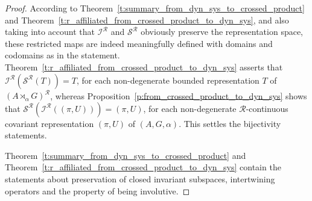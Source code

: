 \documentclass{amsart}
\theoremstyle{plain}
\theoremstyle{definition}
\numberwithin{equation}{section}
\begin{document}
\begin{proof}
According to Theorem~\ref{t:summary_from_dyn_sys_to_crossed_product} and Theorem~\ref{t:r_affiliated_from_crossed_product_to_dyn_sys}, and also taking into account that ${{\mathcal I}^{\mathcal R}}$ and ${{\mathcal S}^{\mathcal R}}$ obviously preserve the representation space, these restricted maps are indeed meaningfully defined with domains and codomains as in the statement.
Theorem~\ref{t:r_affiliated_from_crossed_product_to_dyn_sys} asserts that ${{\mathcal I}^{\mathcal R}}({{\mathcal S}^{\mathcal R}}(T)) = T$, for each non-degenerate bounded representation $T$ of ${(A {\rtimes}_\alpha G)^\mathcal{R}}$, whereas Proposition~\ref{p:from_crossed_product_to_dyn_sys} shows that ${{\mathcal S}^{\mathcal R}}({{\mathcal I}^{\mathcal R}}({(\pi,U)}))={(\pi,U)}$, for each non-degenerate ${\mathcal R}$-continuous covariant representation ${(\pi,U)}$ of ${(A,G,\alpha)}$. This settles the bijectivity statements.

Theorem~\ref{t:summary_from_dyn_sys_to_crossed_product} and Theorem~\ref{t:r_affiliated_from_crossed_product_to_dyn_sys} contain the statements about preservation of closed invariant subspaces, intertwining operators and the property of being involutive.

\end{proof}
\end{document}
